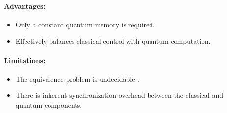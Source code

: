 \paragraph{Advantages:}
\begin{itemize}
    \item Only a constant quantum memory is required.
    \item Effectively balances classical control with quantum computation.
\end{itemize}

\paragraph{Limitations:}
\begin{itemize}
    \item The equivalence problem is undecidable \cite{hirvensalo2008}.
    \item There is inherent synchronization overhead between the classical and quantum components.
\end{itemize}



